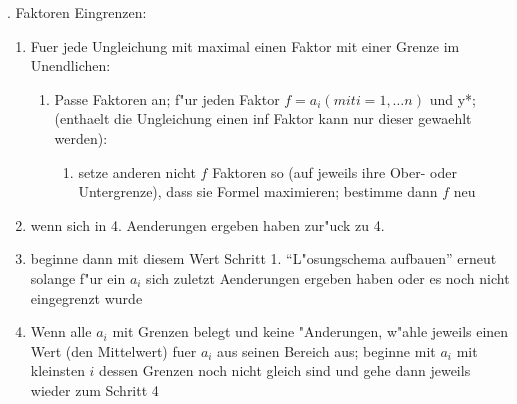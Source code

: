 \bigskip{}. Faktoren Eingrenzen:
\begin{enumerate}
 \item Fuer jede Ungleichung mit maximal einen Faktor mit einer Grenze im Unendlichen:
 \begin{enumerate}
  \item Passe Faktoren an; f"ur jeden Faktor $f = a_i (mit i = 1, \ldots n )$ und y*; (enthaelt die Ungleichung einen inf Faktor kann nur dieser gewaehlt werden):
  \begin{enumerate}
   \item setze anderen nicht $f$ Faktoren so (auf jeweils ihre Ober- oder Untergrenze), dass sie Formel maximieren; bestimme dann $f$ neu
  \end{enumerate}
 \end{enumerate}
 \item wenn sich in 4. Aenderungen ergeben haben zur"uck zu 4.
 \item beginne dann mit diesem Wert Schritt 1. ``L"osungschema aufbauen'' erneut solange f"ur ein $a_i$ sich zuletzt Aenderungen ergeben haben oder es noch nicht eingegrenzt wurde
 \item Wenn alle $a_i$ mit Grenzen belegt und keine "Anderungen, w"ahle jeweils einen Wert (den Mittelwert) fuer $a_i$ aus seinen Bereich aus; beginne mit $a_i$ mit kleinsten $i$ dessen Grenzen noch nicht gleich sind und gehe dann jeweils wieder zum Schritt 4
\end{enumerate}





